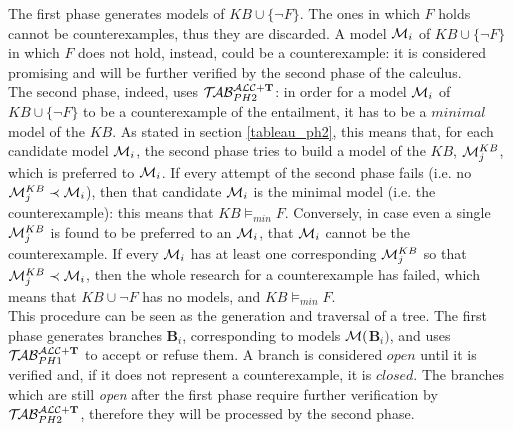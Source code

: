 \documentclass[a4paper, 11pt, oneside]{duthesis}
\newcommand{\tip}{{\bf T}}
\newcommand{\unione} {\cup}
\newcommand{\nott} {\lnot}
\newcommand{\emme} {\begin{mathcal}M\end{mathcal}}
\newcommand{\primo}{\mathrel{{\mathcal{T}\!\mathcal{AB}}}_{PH 1}^{\mathcal{ALC}+\mbox{\scriptsize $\tip$}}}
\newcommand{\secondo}{\mathrel{{\mathcal{T}\!\mathcal{AB}}}_{PH 2}^{\mathcal{ALC}+\mbox{\scriptsize $\tip$}}}
\begin{document}
The first phase generates models of $KB \unione \{\nott F\}$. The ones in which $F$ holds cannot be counterexamples, thus they are discarded. A model $\emme_i$ of $KB \unione \{\nott F\}$ in which $F$ does not hold, instead, could be a counterexample: it is considered promising and will be further verified by the second phase of the calculus.\\
The second phase, indeed, uses $\secondo$: in order for a model $\emme_i$ of $KB \unione \{\nott F\}$ to be a counterexample of the entailment, it has to be a $minimal$ model of the $KB$. As stated in section \ref{tableau_ph2}, this means that, for each candidate model $\emme_i$, the second phase tries to build a model of the $KB$, $\emme_j^{KB}$, which is preferred to $\emme_i$. If every attempt of the second phase fails (i.e. no $\emme_j^{KB} \prec \emme_i$), then that candidate $\emme_i$ is the minimal model (i.e. the counterexample): this means that $KB \models_{min} F$.
Conversely, in case even a single $\emme_j^{KB}$ is found to be preferred to an $\emme_i$, that $\emme_i$ cannot be the counterexample.
If every $\emme_i$ has at least one corresponding $\emme_j^{KB}$ so that $\emme_j^{KB} \prec \emme_i$, then the whole research for a counterexample has failed, which means that $KB \unione \neg F$ has no models, and $KB \models_{min} F$.\\


This procedure can be seen as the generation and traversal of a tree.
The first phase generates branches \textbf{B}$_i$, corresponding to models $\emme($\textbf{B}$_i)$, and uses $\primo$ to accept or refuse them.
A branch is considered $open$ until it is verified and, if it does not represent a counterexample, it is $closed$. The branches which are still \emph{open} after the first phase require further verification by $\secondo$, therefore they will be processed by the second phase.\\
\end{document}

